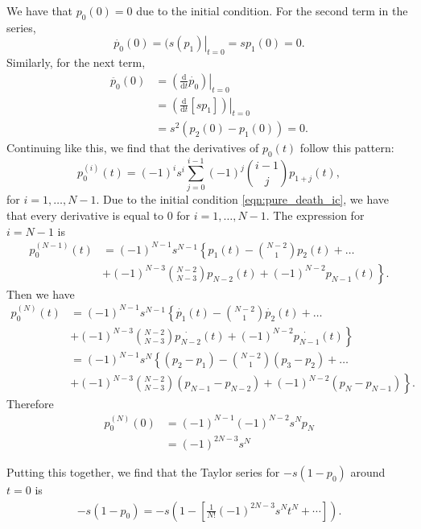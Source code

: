 \documentclass[a4paper,11pt]{report}
\numberwithin{equation}{section}
\newcommand{\diff}[2]{\frac{\mathrm{d} #1}{\mathrm{d} #2}}
\begin{document}
We have that \(p_0(0) = 0\) due to the initial condition. For the second term in
the series,
\begin{equation*}
    \dot{p_0}(0) = \left.(s(p_1)\right|_{t=0} = sp_1(0) = 0.
\end{equation*}
Similarly, for the next term,
\begin{align*}
    \ddot{p_0}(0) &= \left.\left(\diff{}{t}\dot{p_0}\right)\right|_{t=0}\\
    &= \left.\left(\diff{}{t}\left[s p_1\right]\right)\right|_{t=0}\\
    &= s^2\left(p_2(0) - p_1(0)\right) = 0.
\end{align*}
Continuing like this, we find that the derivatives of \(p_0(t)\) follow this
pattern:
\begin{equation*}
    p_0^{(i)}(t) = (-1)^i s^i \sum_{j=0}^{i-1}(-1)^j
    \binom{i-1}{j} p_{1+j}(t),
\end{equation*}
for \(i=1,\dotsc,N-1\).
Due to the initial condition \eqref{eqn:pure_death_ic}, we have that every
derivative is equal to \(0\) for \(i=1,\dotsc,N-1\). The expression for
\(i=N-1\) is
\begin{align*}
    p_0^{(N-1)}(t) &= (-1)^{N-1} s^{N-1} \left\{ p_1(t) - \binom{N-2}{1}p_2(t) +
    \dotsc \right.\\
    &\left.+ (-1)^{N-3} \binom{N-2}{N-3} p_{N-2}(t) +
    (-1)^{N-2}p_{N-1}(t)\right\}.
\end{align*}
Then we have
\begin{align*}
    p_0^{(N)}(t) &= (-1)^{N-1} s^{N-1} \left\{ \dot{p_1}(t) -
    \binom{N-2}{1}\dot{p_2}(t) +
    \dotsc \right.\\
    &\left.+ (-1)^{N-3} \binom{N-2}{N-3} \dot{p_{N-2}}(t) +
    (-1)^{N-2}\dot{p_{N-1}}(t)\right\}\\
    &= (-1)^{N-1} s^{N} \left\{ (p_2-p_1) -
    \binom{N-2}{1}(p_3-p_2) +
    \dotsc \right.\\
    &\left.+ (-1)^{N-3} \binom{N-2}{N-3} (p_{N-1} - p_{N-2}) +
    (-1)^{N-2} (p_N - p_{N-1})\right\}.
\end{align*}
Therefore
\begin{align*}
    p_0^{(N)}(0) &= (-1)^{N-1} (-1)^{N-2} s^N p_N\\
    &= (-1)^{2N-3} s^N
\end{align*}

Putting this together, we find that the Taylor series for \(-s(1-p_0)\) around
\(t=0\) is
\begin{align*}
    -s(1-p_0) = -s\left(1 - \left[ \frac{1}{N!}(-1)^{2N-3}s^N t^N + \dotsb
    \right] \right).
\end{align*}
\end{document}
